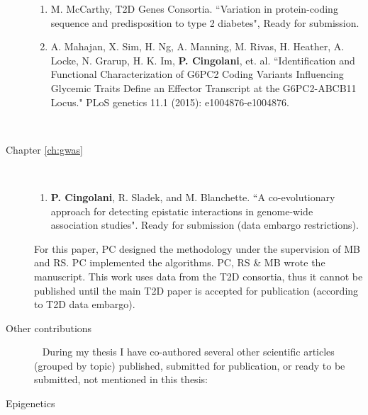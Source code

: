 \begin{description}
		\begin{enumerate}[resume]
		
			\item M. McCarthy, T2D Genes Consortia. ``Variation in protein-coding sequence and predisposition to type 2 diabetes", Ready for submission.
			
			\item A. Mahajan, X. Sim, H. Ng, A. Manning, M. Rivas, H. Heather, A. Locke, N. Grarup, H. K. Im, \textbf{P. Cingolani}, et. al. ``Identification and Functional Characterization of G6PC2 Coding Variants Influencing Glycemic Traits Define an Effector Transcript at the G6PC2-ABCB11 Locus." PLoS genetics 11.1 (2015): e1004876-e1004876.
		
		\end{enumerate}
		~ \\
	
	\item[Chapter \ref{ch:gwas}] ~
	
		\begin{enumerate}[resume]
		\item \textbf{P. Cingolani}, R. Sladek, and M. Blanchette. ``A co-evolutionary approach for detecting epistatic interactions in genome-wide association studies". Ready for submission (data embargo restrictions).
		\end{enumerate}
	
		For this paper, PC designed the methodology under the supervision of MB and RS. PC implemented the algorithms. PC, RS \& MB wrote the manuscript. This work uses data from the T2D consortia, thus it cannot be published until the main T2D paper is accepted for publication (according to T2D data embargo).
		\\
	
	\item[Other contributions] ~	\linebreak
		During my thesis I have co-authored several other scientific articles (grouped by topic) published, submitted for publication, or ready to be submitted, not mentioned in this thesis:
		\\

	\item[Epigenetics] ~


\end{description}

